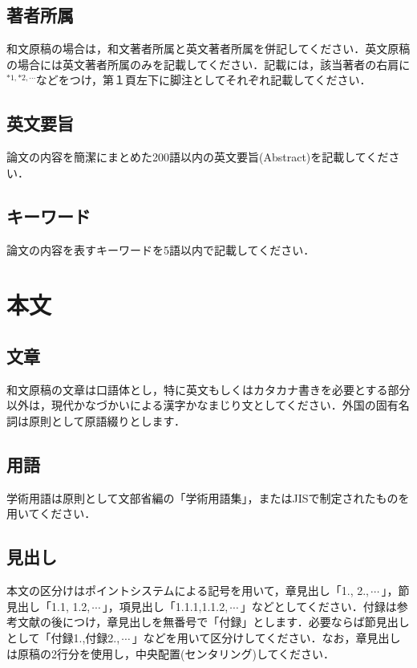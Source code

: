 \documentclass{hisken}
\begin{document}
\subsection{著者所属}
和文原稿の場合は，和文著者所属と英文著者所属を併記してください．英文原稿の場合には英文著者所属のみを記載してください．記載には，該当著者の右肩に$^ {*1,*2,\cdots}$などをつけ，第１頁左下に脚注としてそれぞれ記載してください．

\subsection{英文要旨}
論文の内容を簡潔にまとめた200語以内の英文要旨(Abstract)を記載してください．

\subsection{キーワード}
論文の内容を表すキーワードを5語以内で記載してください．


\section{本文}

\subsection{文章}
和文原稿の文章は口語体とし，特に英文もしくはカタカナ書きを必要とする部分以外は，現代かなづかいによる漢字かなまじり文としてください．外国の固有名詞は原則として原語綴りとします．
\subsection{用語}
学術用語は原則として文部省編の「学術用語集」，またはJISで制定されたものを用いてください．
\subsection{見出し}
本文の区分けはポイントシステムによる記号を用いて，章見出し「1., 2.,\,$ \cdots$\,」，節見出し「1.1, 1.2,\,$ \cdots$\,」，項見出し「1.1.1,1.1.2,\,$ \cdots$\,」などとしてください．付録は参考文献の後につけ，章見出しを無番号で「付録」とします．必要ならば節見出しとして「付録1.,付録2.,\,$ \cdots$\,」などを用いて区分けしてください．なお，章見出しは原稿の2行分を使用し，中央配置(センタリング)してください．
\end{document}
